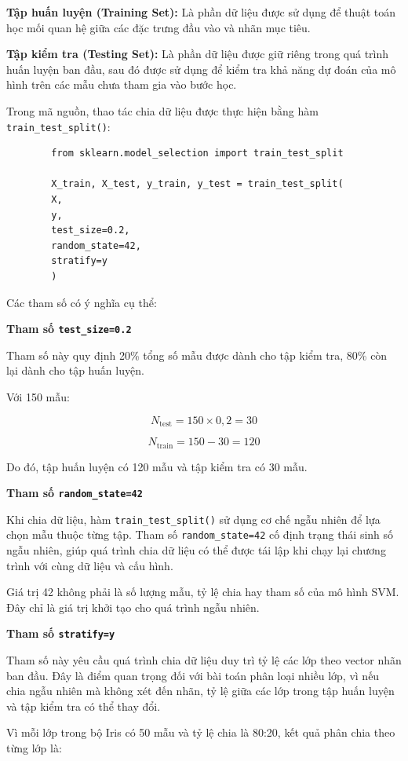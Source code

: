 \documentclass[14pt]{extarticle}
\begin{document}
	\textbf{Tập huấn luyện (Training Set):} Là phần dữ liệu được sử dụng để thuật toán học mối quan hệ giữa các đặc trưng đầu vào và nhãn mục tiêu.
	
	\textbf{Tập kiểm tra (Testing Set):} Là phần dữ liệu được giữ riêng trong quá trình huấn luyện ban đầu, sau đó được sử dụng để kiểm tra khả năng dự đoán của mô hình trên các mẫu chưa tham gia vào bước học.
	
	Trong mã nguồn, thao tác chia dữ liệu được thực hiện bằng hàm \texttt{train\_test\_split()}:
	
	\begin{verbatim}
		from sklearn.model_selection import train_test_split
		
		X_train, X_test, y_train, y_test = train_test_split(
		X,
		y,
		test_size=0.2,
		random_state=42,
		stratify=y
		)
	\end{verbatim}
	
	Các tham số có ý nghĩa cụ thể:
	
	\textbf{Tham số \texttt{test\_size=0.2}}
	
	Tham số này quy định 20\% tổng số mẫu được dành cho tập kiểm tra, 80\% còn lại dành cho tập huấn luyện.
	
	Với 150 mẫu:
	
	\[
	N_{\text{test}}=150\times0,2=30
	\]
	
	\[
	N_{\text{train}}=150-30=120
	\]
	
	Do đó, tập huấn luyện có 120 mẫu và tập kiểm tra có 30 mẫu.
	
	\textbf{Tham số \texttt{random\_state=42}}
	
	Khi chia dữ liệu, hàm \texttt{train\_test\_split()} sử dụng cơ chế ngẫu nhiên để lựa chọn mẫu thuộc từng tập. Tham số \texttt{random\_state=42} cố định trạng thái sinh số ngẫu nhiên, giúp quá trình chia dữ liệu có thể được tái lập khi chạy lại chương trình với cùng dữ liệu và cấu hình.
	
	Giá trị 42 không phải là số lượng mẫu, tỷ lệ chia hay tham số của mô hình SVM. Đây chỉ là giá trị khởi tạo cho quá trình ngẫu nhiên.
	
	\textbf{Tham số \texttt{stratify=y}}
	
	Tham số này yêu cầu quá trình chia dữ liệu duy trì tỷ lệ các lớp theo vector nhãn ban đầu. Đây là điểm quan trọng đối với bài toán phân loại nhiều lớp, vì nếu chia ngẫu nhiên mà không xét đến nhãn, tỷ lệ giữa các lớp trong tập huấn luyện và tập kiểm tra có thể thay đổi.
	
	Vì mỗi lớp trong bộ Iris có 50 mẫu và tỷ lệ chia là 80:20, kết quả phân chia theo từng lớp là:
	
\end{document}
